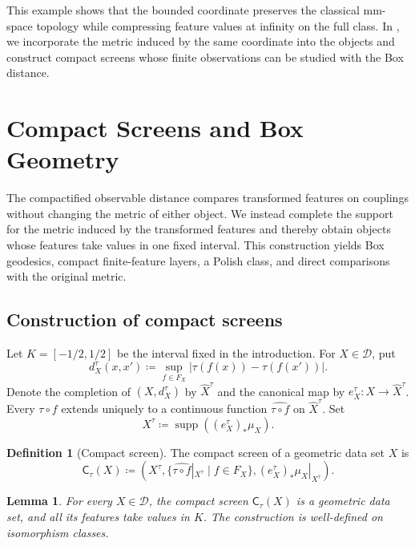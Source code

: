 \documentclass[11pt]{amsart}
\theoremstyle{plain}
\newtheorem{lemma}[theorem]{Lemma}
\theoremstyle{definition}
\newtheorem{definition}[theorem]{Definition}
\theoremstyle{remark}
\newcommand{\D}{\mathcal D}
\DeclareMathOperator{\supp}{supp}
\begin{document}
This example shows that the bounded coordinate preserves the classical mm-space topology while compressing feature values at infinity on the full class. In , we incorporate the metric induced by the same coordinate into the objects and construct compact screens whose finite observations can be studied with the Box distance.

\section{Compact Screens and Box Geometry}
\label{sec:compact-screen-box}

The compactified observable distance compares transformed features on couplings without changing the metric of either object. We instead complete the support for the metric induced by the transformed features and thereby obtain objects whose features take values in one fixed interval. This construction yields Box geodesics, compact finite-feature layers, a Polish class, and direct comparisons with the original metric.

\subsection{Construction of compact screens}
\label{subsec:compact-screen-construction}

Let $K=[-1/2,1/2]$ be the interval fixed in the introduction. For $X\in\D$, put
\[
d_X^\tau(x,x')\coloneqq
\sup_{f\in F_X}|\tau(f(x))-\tau(f(x'))|.
\]
Denote the completion of $(X,d_X^\tau)$ by $\widehat X^\tau$ and the canonical map by $e_X^\tau\colon X\to\widehat X^\tau$. Every $\tau\circ f$ extends uniquely to a continuous function $\widehat{\tau\circ f}$ on $\widehat X^\tau$. Set
\[
X^\tau\coloneqq\supp((e_X^\tau)_*\mu_X).
\]

\begin{definition}[Compact screen]
\label{def:compact-screen}
The compact screen of a geometric data set $X$ is
\[
\mathsf C_\tau(X)\coloneqq
\left(
X^\tau,
\{\widehat{\tau\circ f}|_{X^\tau}\mid f\in F_X\},
(e_X^\tau)_*\mu_X|_{X^\tau}
\right).
\]
\end{definition}

\begin{lemma}
\label{lem:compact-screen-gds}
For every $X\in\D$, the compact screen $\mathsf C_\tau(X)$ is a geometric data set, and all its features take values in $K$. The construction is well-defined on isomorphism classes.
\end{lemma}
\end{document}
